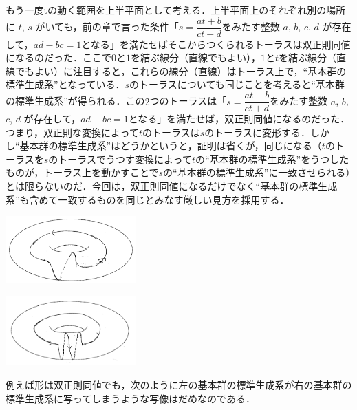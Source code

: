 もう一度tの動く範囲を上半平面として考える．上半平面上のそれぞれ別の場所に $t$, $s$ がいても，前の章で言った条件「$s=\dfrac {at+b} {ct+d}$をみたす整数 $a$, $b$, $c$, $d$ が存在して，$ad-bc=1$となる」を満たせばそこからつくられるトーラスは双正則同値になるのだった．ここで$0$と$1$を結ぶ線分（直線でもよい），$1$と$t$を結ぶ線分（直線でもよい）に注目すると，これらの線分（直線）はトーラス上で，``基本群の標準生成系''となっている．$s$のトーラスについても同じことを考えると``基本群の標準生成系''が得られる．この$2$つのトーラスは「$s=\dfrac {at+b} {ct+d}$をみたす整数 $a$, $b$, $c$, $d$ が存在して，$ad-bc=1$となる」を満たせば，双正則同値になるのだった．つまり，双正則な変換によって$t$のトーラスは$s$のトーラスに変形する．しかし``基本群の標準生成系''はどうかというと，証明は省くが，同じになる（$t$のトーラスを$s$のトーラスでうつす変換によって$t$の``基本群の標準生成系''をうつしたものが，トーラス上を動かすことで$s$の``基本群の標準生成系''に一致させられる）とは限らないのだ．今回は，双正則同値になるだけでなく``基本群の標準生成系''も含めて一致するものを同じとみなす厳しい見方を採用する．\\
\begin{minipage}{0.5\hsize}
\includegraphics[width=5cm]{asaka12.png}\\
\end{minipage}
\begin{minipage}{0.5\hsize}
\includegraphics[width=5cm]{asaka14.png}\\
\end{minipage}

例えば形は双正則同値でも，次のように左の基本群の標準生成系が右の基本群の標準生成系に写ってしまうような写像はだめなのである．

